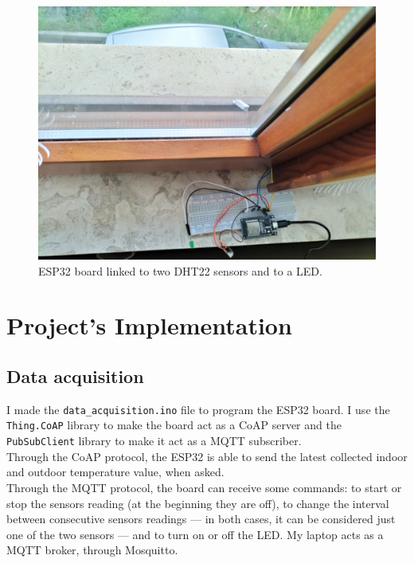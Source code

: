 \documentclass[conference]{IEEEtran}
\begin{document}
\begin{figure}[htbp]
\centerline{\includegraphics[scale=0.06]{figures/figure_esp.jpg}}
\caption{ESP32 board linked to two DHT22 sensors and to a LED.}
\label{fig_esp}
\end{figure}


\section{Project’s Implementation}

\subsection{Data acquisition}
I made the \texttt{data\_acquisition.ino} file to program the ESP32 board. I use the \texttt{Thing.CoAP} library to make the board act as a CoAP server and the \texttt{PubSubClient} library to make it act as a MQTT subscriber.\\
Through the CoAP protocol, the ESP32 is able to send the latest collected indoor and outdoor temperature value, when asked.\\
Through the MQTT protocol, the board can receive some commands: to start or stop the sensors reading (at the beginning they are off), to change the interval between consecutive sensors readings --- in both cases, it can be considered just one of the two sensors --- and to turn on or off the LED. My laptop acts as a MQTT broker, through Mosquitto.
\end{document}
